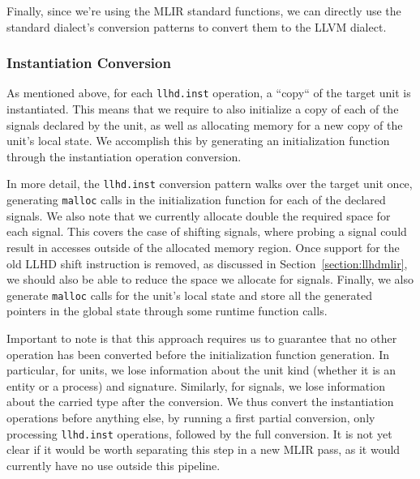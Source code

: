 Finally, since we're using the MLIR standard functions, we can directly use the standard dialect's conversion patterns to convert them to the LLVM dialect.


\subsubsection{Instantiation Conversion}
As mentioned above, for each \texttt{llhd.inst} operation, a “copy“ of the target unit is instantiated. This means that we require to also initialize a copy of each of the signals declared by the unit, as well as allocating memory for a new copy of the unit's local state. We accomplish this by generating an initialization function through the instantiation operation conversion.

In more detail, the \texttt{llhd.inst} conversion pattern walks over the target unit once,  generating \texttt{malloc} calls in the initialization function for each of the declared signals. We also note that we currently allocate double the required space for each signal. This covers the case of shifting signals, where probing a signal could result in accesses outside of the allocated memory region. Once support for the old LLHD shift instruction is removed, as discussed in Section~\ref{section:llhdmlir}, we should also be able to reduce the space we allocate for signals.
Finally, we also generate \texttt{malloc} calls for the unit's local state and store all the generated pointers in the global state through some runtime function calls.

Important to note is that this approach requires us to guarantee that no other operation has been converted before the initialization function generation. In particular, for units, we lose information about the unit kind (whether it is an entity or a process) and signature. Similarly, for signals, we lose information about the carried type after the conversion. We thus convert the instantiation operations before anything else, by running a first partial conversion, only processing \texttt{llhd.inst} operations, followed by the full conversion. It is not yet clear if it would be worth separating this step in a new MLIR pass, as it would currently have no use outside this pipeline.

